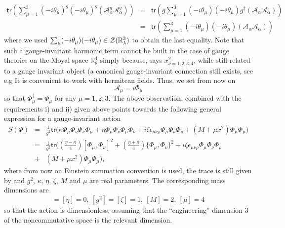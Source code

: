 \documentclass[10pt]{book}
\newcommand{\tr}{\mathsf{tr}}
\theoremstyle{break}
\begin{document}
%
\begin{eqnarray}
\tr(\sum_{\mu=1}^3(-i\theta_\mu)^g (-i\theta_\mu)^g (\mathcal{A}^g_\alpha \mathcal{A}^g_\alpha) ) &=& 
\tr( g \sum_{\mu=1}^3(-i\theta_\mu)(-i\theta_\mu) g^\dag (\mathcal{A}_\alpha \mathcal{A}_\alpha) )\nonumber\\
&=& \tr( \sum_{\mu=1}^3(-i\theta_\mu)(-i\theta_\mu) (\mathcal{A}_\alpha \mathcal{A}_\alpha) )
\end{eqnarray}
%
where we used $\sum_\mu(-i\theta_\mu)(-i\theta_\mu)\in{\cal{Z}}(\mathbb{R}^3_\lambda)$ to obtain the last equality. Note that such a gauge-invariant harmonic term cannot be built in the case of gauge theories on the Moyal space $\mathbb{R}^4_\theta$ %
simply because, says $x_{\nu=1,2,3,4}^2$, while still related to a gauge invariant object (a canonical gauge-invariant connection still exists, see e.g %
%
It is convenient to work with hermitean fields. Thus, we set from now on
\begin{equation*}
\mathcal{A}_\mu = i \Phi_\mu
\end{equation*}
so that $\Phi^\dag_\mu = \Phi_\mu$ for any $\mu=1,2,3$. The above observation, combined with the requirements i) and ii) given above points towards the following general expression for a gauge-invariant action%
%
\begin{eqnarray}%
S(\Phi)&=&\frac{1}{g^2} \tr\big( \kappa \Phi_\mu \Phi_\nu \Phi_\nu \Phi_\mu + \eta \Phi_\mu \Phi_\nu \Phi_\mu \Phi_\nu + i \zeta \epsilon_{\mu\nu\rho} \Phi_\mu \Phi_\nu \Phi_\rho + (M+\mu x^2) \Phi_\mu \Phi_\mu \big)\nonumber\\
&=&\frac{1}{g^2} \tr\big((\frac{\eta-\kappa}{4})[\Phi_\mu,\Phi_\nu]^2+(\frac{\eta+\kappa}{4})\{\Phi_\mu,\Phi_\nu \}^2
+ i \zeta \epsilon_{\mu\nu\rho} \Phi_\mu \Phi_\nu \Phi_\rho\nonumber\\
&+& (M+\mu x^2) \Phi_\mu \Phi_\mu \big), %
\end{eqnarray}
%
where from now on Einstein summation convention is used, the trace is still given by %
and $g^2$, $\kappa$, $\eta$, $\zeta$, $M$ and $\mu$ are real parameters. The corresponding mass dimensions are
\begin{equation}
[\kappa]=[\eta]=0,\ [g^2]=[\zeta]=1,\ [M]=2,\ [\mu]=4%
\end{equation}
so that the action %
is dimensionless, assuming that the ``engineering'' dimension $3$ of the noncommutative space is the relevant dimension.\par%
\end{document}
